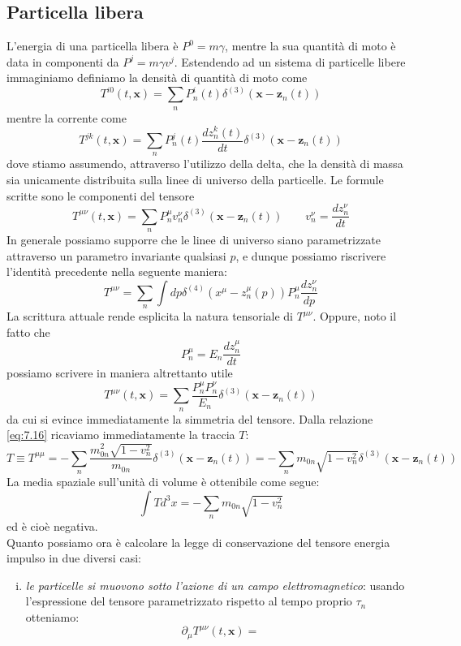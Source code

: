 \documentclass[a4paper,11pt]{book}
\theoremstyle{plain}
\theoremstyle{definition}
\begin{document}
\subsection{Particella libera}
L'energia di una particella libera è $P^0 = m\gamma$, mentre la sua quantità di moto è data in componenti da $P^j = m\gamma v^j$. Estendendo ad un sistema di particelle libere immaginiamo definiamo la densità di quantità di moto come
\begin{equation}
T^{i0}(t,\textbf{x}) = \sum_n P^i_n(t)\delta^{(3)}(\textbf{x}-\textbf{z}_n(t))
\end{equation}
mentre la corrente come
\begin{equation}
T^{jk}(t,\textbf{x}) = \sum_n P_n^j(t)\frac{dz_n^k(t)}{dt}\delta^{(3)}(\textbf{x}-\textbf{z}_n(t))
\end{equation}
dove stiamo assumendo, attraverso l'utilizzo della delta, che la densità di massa sia unicamente distribuita sulla linee di universo della particelle. Le formule scritte sono le componenti del tensore
\begin{equation}
T^{\mu\nu} (t,\textbf{x})=\sum_n P_n^{\mu}v_n^{\nu}\delta^{(3)}(\textbf{x}-\textbf{z}_n(t)) \qquad v_n^{\nu} = \frac{dz_n^{\nu}}{dt}
\end{equation}
In generale possiamo supporre che le linee di universo siano parametrizzate attraverso un parametro invariante qualsiasi $p$, e dunque possiamo riscrivere l'identità precedente nella seguente maniera:
\[
T^{\mu\nu} = \sum_n \int dp \delta^{(4)}(x^{\mu}-z_n^{\mu}(p))P_n^{\mu}\frac{dz_n^{\nu}}{dp}
\]
La scrittura attuale rende esplicita la natura tensoriale di $T^{\mu\nu}$. Oppure, noto il fatto che
\[
P^{\mu}_n = E_n \frac{dz_n^{\mu}}{dt} 
\]
possiamo scrivere in maniera altrettanto utile
\begin{equation}\label{eq:7.16}
T^{\mu\nu}(t,\textbf{x}) = \sum_n \frac{P_n^{\mu}P_n^{\nu}}{E_n}\delta^{(3)}(\textbf{x}-\textbf{z}_n(t))
\end{equation}
da cui si evince immediatamente la simmetria del tensore. Dalla relazione \eqref{eq:7.16} ricaviamo immediatamente la traccia $T$:
\[
T\equiv T^{\mu\mu} = -\sum_n \frac{m_{0n}^2\sqrt{1-v_n^2}}{m_{0n}}\delta^{(3)}(\textbf{x}-\textbf{z}_n(t)) = -\sum_n m_{0n}\sqrt{1-v_n^2}\delta^{(3)}(\textbf{x}-\textbf{z}_n(t))
\]
La media spaziale sull'unità di volume è ottenibile come segue:
\[
\int T d^3x = -\sum_n m_{0n}\sqrt{1-v_n^2}
\]
ed è cioè negativa. \\
Quanto possiamo ora è calcolare la legge di conservazione del tensore energia impulso in due diversi casi: 
\begin{enumerate}[i.]
\item \emph{le particelle si muovono sotto l'azione di un campo elettromagnetico}: usando l'espressione del tensore parametrizzato rispetto al tempo proprio $\tau_n$ otteniamo:
\[
\partial_{\mu}T^{\mu\nu}(t,\textbf{x}) = 
\]

\end{enumerate}
\end{document}

